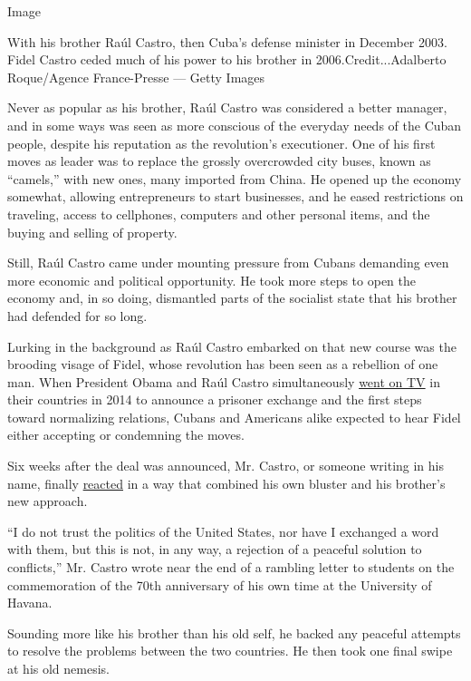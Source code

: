 Image

With his brother Raúl Castro, then Cuba's defense minister in December
2003. Fidel Castro ceded much of his power to his brother in
2006.Credit...Adalberto Roque/Agence France-Presse --- Getty Images

Never as popular as his brother, Raúl Castro was considered a better
manager, and in some ways was seen as more conscious of the everyday
needs of the Cuban people, despite his reputation as the revolution's
executioner. One of his first moves as leader was to replace the grossly
overcrowded city buses, known as ``camels,'' with new ones, many
imported from China. He opened up the economy somewhat, allowing
entrepreneurs to start businesses, and he eased restrictions on
traveling, access to cellphones, computers and other personal items, and
the buying and selling of property.

Still, Raúl Castro came under mounting pressure from Cubans demanding
even more economic and political opportunity. He took more steps to open
the economy and, in so doing, dismantled parts of the socialist state
that his brother had defended for so long.

Lurking in the background as Raúl Castro embarked on that new course was
the brooding visage of Fidel, whose revolution has been seen as a
rebellion of one man. When President Obama and Raúl Castro
simultaneously
\href{http://www.nytimes.com/video/world/americas/100000003332576/raul-castro-on-restoration-of-diplomacy.html}{went
on TV} in their countries in 2014 to announce a prisoner exchange and
the first steps toward normalizing relations, Cubans and Americans alike
expected to hear Fidel either accepting or condemning the moves.

Six weeks after the deal was announced, Mr. Castro, or someone writing
in his name, finally
\href{http://www.nytimes.com/2015/01/28/world/americas/fidel-castro-breaks-silence-over-thaw-in-us-cuba-relations.html}{reacted}
in a way that combined his own bluster and his brother's new approach.

``I do not trust the politics of the United States, nor have I exchanged
a word with them, but this is not, in any way, a rejection of a peaceful
solution to conflicts,'' Mr. Castro wrote near the end of a rambling
letter to students on the commemoration of the 70th anniversary of his
own time at the University of Havana.

Sounding more like his brother than his old self, he backed any peaceful
attempts to resolve the problems between the two countries. He then took
one final swipe at his old nemesis.

